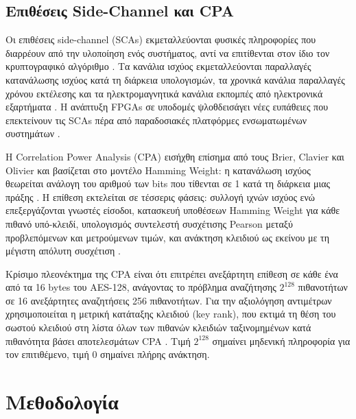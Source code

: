 \subsection*{Επιθέσεις Side-Channel και CPA}

Οι επιθέσεις side-channel (SCAs) εκμεταλλεύονται φυσικές πληροφορίες που διαρρέουν από την υλοποίηση ενός συστήματος, αντί να επιτίθενται στον ίδιο τον κρυπτογραφικό αλγόριθμο \cite{gattu2020power}. Τα κανάλια ισχύος εκμεταλλεύονται παραλλαγές κατανάλωσης ισχύος κατά τη διάρκεια υπολογισμών, τα χρονικά κανάλια παραλλαγές χρόνου εκτέλεσης και τα ηλεκτρομαγνητικά κανάλια εκπομπές από ηλεκτρονικά εξαρτήματα \cite{gandolfi2001electromagnetic}. Η ανάπτυξη FPGAs σε υποδομές ψλοθδεισάγει νέες ευπάθειες που επεκτείνουν τις SCAs πέρα από παραδοσιακές πλατφόρμες ενσωματωμένων συστημάτων \cite{zhao2018fpga}.

Η Correlation Power Analysis (CPA) εισήχθη επίσημα από τους Brier, Clavier και Olivier \cite{brier2004correlation} και βασίζεται στο μοντέλο Hamming Weight: η κατανάλωση ισχύος θεωρείται ανάλογη του αριθμού των bits που τίθενται σε 1 κατά τη διάρκεια μιας πράξης \cite{lo2017power}. Η επίθεση εκτελείται σε τέσσερις φάσεις: συλλογή ιχνών ισχύος ενώ επεξεργάζονται γνωστές είσοδοι, κατασκευή υποθέσεων Hamming Weight για κάθε πιθανό υπό-κλειδί, υπολογισμός συντελεστή συσχέτισης Pearson μεταξύ προβλεπόμενων και μετρούμενων τιμών, και ανάκτηση κλειδιού ως εκείνου με τη μέγιστη απόλυτη συσχέτιση \cite{lo2017power,brier2004correlation}.


Κρίσιμο πλεονέκτημα της CPA είναι ότι επιτρέπει ανεξάρτητη επίθεση σε κάθε ένα από τα 16 bytes του AES-128, ανάγοντας το πρόβλημα αναζήτησης $2^{128}$ πιθανοτήτων σε 16 ανεξάρτητες αναζητήσεις 256 πιθανοτήτων\cite{lo2017power}. Για την αξιολόγηση αντιμέτρων χρησιμοποιείται η μετρική κατάταξης κλειδιού (key rank), που εκτιμά τη θέση του σωστού κλειδιού στη λίστα όλων των πιθανών κλειδιών ταξινομημένων κατά πιθανότητα βάσει αποτελεσμάτων CPA \cite{spielmann2023rds}. Τιμή $2^{128}$ σημαίνει μηδενική πληροφορία για τον επιτιθέμενο, τιμή 0 σημαίνει πλήρης ανάκτηση.

\section*{Μεθοδολογία}

